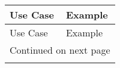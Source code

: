 \begin{longtable}{p{} p{}}
\toprule
      Use Case &                                                                                                                                                                                                                                                                                                                                                                                                                      Example \\ \midrule
\midrule
\endfirsthead

\toprule
      Use Case &                                                                                                                                                                                                                                                                                                                                                                                                                      Example \\ \midrule
\midrule
\endhead
\midrule
\multicolumn{2}{r}{{Continued on next page}} \\ \midrule
\midrule
\endfoot


\end{longtable}
